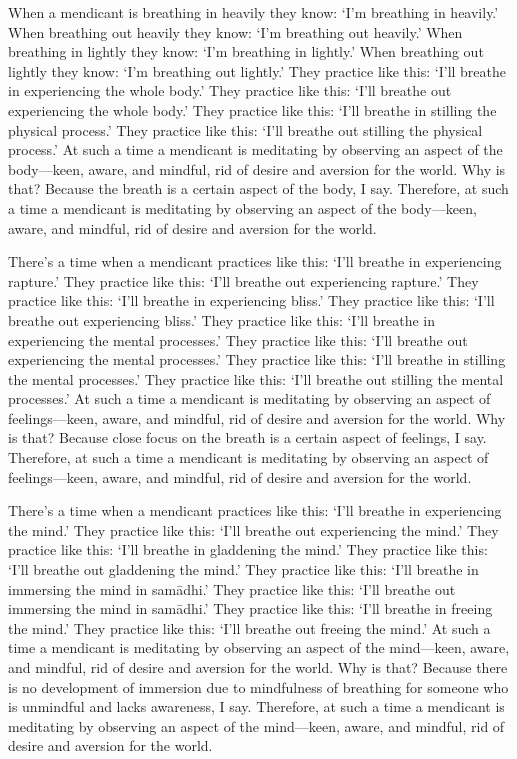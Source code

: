 \documentclass[12pt,openany]{book}%
\begin{document}
When a mendicant is breathing in heavily they know: ‘I’m breathing in heavily.’ When breathing out heavily they know: ‘I’m breathing out heavily.’ When breathing in lightly they know: ‘I’m breathing in lightly.’ When breathing out lightly they know: ‘I’m breathing out lightly.’ They practice like this: ‘I’ll breathe in experiencing the whole body.’ They practice like this: ‘I’ll breathe out experiencing the whole body.’ They practice like this: ‘I’ll breathe in stilling the physical process.’ They practice like this: ‘I’ll breathe out stilling the physical process.’ At such a time a mendicant is meditating by observing an aspect of the body—keen, aware, and mindful, rid of desire and aversion for the world. Why is that? Because the breath is a certain aspect of the body, I say. Therefore, at such a time a mendicant is meditating by observing an aspect of the body—keen, aware, and mindful, rid of desire and aversion for the world. 

There’s a time when a mendicant practices like this: ‘I’ll breathe in experiencing rapture.’ They practice like this: ‘I’ll breathe out experiencing rapture.’ They practice like this: ‘I’ll breathe in experiencing bliss.’ They practice like this: ‘I’ll breathe out experiencing bliss.’ They practice like this: ‘I’ll breathe in experiencing the mental processes.’ They practice like this: ‘I’ll breathe out experiencing the mental processes.’ They practice like this: ‘I’ll breathe in stilling the mental processes.’ They practice like this: ‘I’ll breathe out stilling the mental processes.’ At such a time a mendicant is meditating by observing an aspect of feelings—keen, aware, and mindful, rid of desire and aversion for the world. Why is that? Because close focus on the breath is a certain aspect of feelings, I say. Therefore, at such a time a mendicant is meditating by observing an aspect of feelings—keen, aware, and mindful, rid of desire and aversion for the world. 

There’s a time when a mendicant practices like this: ‘I’ll breathe in experiencing the mind.’ They practice like this: ‘I’ll breathe out experiencing the mind.’ They practice like this: ‘I’ll breathe in gladdening the mind.’ They practice like this: ‘I’ll breathe out gladdening the mind.’ They practice like this: ‘I’ll breathe in immersing the mind in \textsanskrit{samādhi}.’ They practice like this: ‘I’ll breathe out immersing the mind in \textsanskrit{samādhi}.’ They practice like this: ‘I’ll breathe in freeing the mind.’ They practice like this: ‘I’ll breathe out freeing the mind.’ At such a time a mendicant is meditating by observing an aspect of the mind—keen, aware, and mindful, rid of desire and aversion for the world. Why is that? Because there is no development of immersion due to mindfulness of breathing for someone who is unmindful and lacks awareness, I say. Therefore, at such a time a mendicant is meditating by observing an aspect of the mind—keen, aware, and mindful, rid of desire and aversion for the world. 
\end{document}
